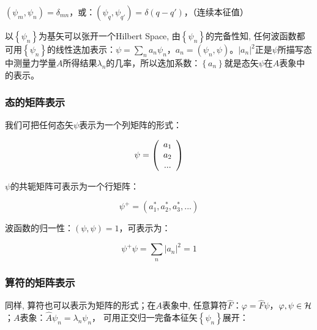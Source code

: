 $\left( {\psi _m ,\psi _n } \right) = \delta _{mn} $，或：$\left( {\psi _q ,\psi _{q'} } \right) = \delta \left( {q - q'} \right)$，（连续本征值）

以$\left\{ {\psi _n } \right\}$为基矢可以张开一个Hilbert Space,
由$\left\{ {\psi _n } \right\}$的完备性知, 任何波函数都可用$\left\{
{\psi _n } \right\}$的线性迭加表示：$\psi  = \sum\limits_n {a_n \psi
_n } $，$a_n  = \left( {\psi _n ,\psi } \right)$。$\left| {a_n }
\right|^2 $正是$\psi$所描写态中测量力学量$A$所得结果$\lambda
_n$的几率，所以迭加系数：$\left\{ {a_n }
\right\}$就是态矢$\psi$在$A$表象中的表示。


\subsubsection{态的矩阵表示}

我们可把任何态矢$\psi$表示为一个列矩阵的形式：


\begin{equation}\label{19-1}
\psi  = \left( {\begin{array}{*{20}c}
   {a_1 }  \\
   {a_2 }  \\
   {...}  \\
\end{array}} \right)
\end{equation}

$\psi$的共轭矩阵可表示为一个行矩阵：

\begin{equation}\label{19-2}
\psi ^ +   = \left( {a_1^* ,a_2^* ,a_3^* ,...} \right)
\end{equation}

波函数的归一性：$\left( {\psi ,\psi } \right) = 1$，可表示为：

\begin{equation}\label{19-3}
\psi ^ +  \psi  = \sum\limits_n {\left| {a_n } \right|^2 }  = 1
\end{equation}


\subsubsection{算符的矩阵表示}

同样, 算符也可以表示为矩阵的形式；在$A$表象中, 任意算符$\hat
F$：$\varphi  = \widehat F\psi $，$\varphi ,\psi  \in {\cal
H}$；$A$表象：$\widehat A\psi _n  = \lambda _n \psi _n $，
可用正交归一完备本征矢$\left\{ {\psi _n } \right\}$展开：

